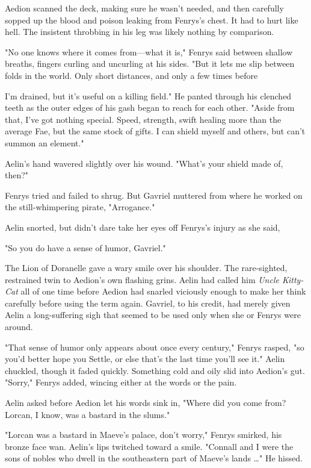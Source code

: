 Aedion scanned the deck, making sure he wasn't needed, and then carefully sopped up the blood and poison leaking from Fenrys's chest. It had to hurt like hell. The insistent throbbing in his leg was likely nothing by comparison.

"No one knows where it comes from---what it is," Fenrys said between shallow breaths, fingers curling and uncurling at his sides. "But it lets me slip between folds in the world. Only short distances, and only a few times before

I'm drained, but  it's useful on a killing field." He panted through his clenched teeth as the outer edges of his gash began to reach for each other. "Aside from that, I've got nothing special. Speed, strength, swift healing  more than the average Fae, but the same stock of gifts. I can shield myself and others, but can't summon an element."

Aelin's hand wavered slightly over his wound. "What's your shield made of, then?"

Fenrys tried and failed to shrug. But Gavriel muttered from where he worked on the still-whimpering pirate, "Arrogance."

Aelin snorted, but didn't dare take her eyes off Fenrys's injury as she said,

"So you do have a sense of humor, Gavriel."

The Lion of Doranelle gave a wary smile over his shoulder. The rare-sighted, restrained twin to Aedion's own flashing grins. Aelin had called him \emph{Uncle Kitty-Cat} all of one time before Aedion had snarled viciously enough to make her think carefully before using the term again. Gavriel, to his credit, had merely given Aelin a long-suffering sigh that seemed to be used only when she or Fenrys were around.

"That sense of humor only appears about once every century," Fenrys rasped, "so you'd better hope you Settle, or else that's the last time you'll see it." Aelin chuckled, though it faded quickly. Something cold and oily slid into Aedion's gut. "Sorry," Fenrys added, wincing either at the words or the pain.

Aelin asked before Aedion let his words sink in, "Where did you come from? Lorcan, I know, was a bastard in the slums."

"Lorcan was a bastard in Maeve's palace, don't worry," Fenrys smirked, his bronze face wan. Aelin's lips twitched toward a smile. "Connall and I were the sons of nobles who dwell in the southeastern part of Maeve's lands \ldots" He hissed.

